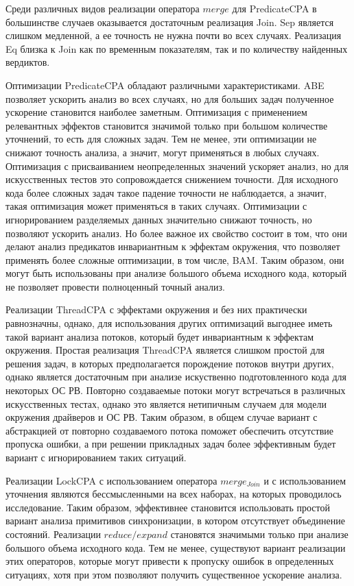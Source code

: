 Среди различных видов реализации оператора $merge$ для PredicateCPA в большинстве случаев оказывается достаточным реализация Join. 
Sep является слишком медленной, а ее точность не нужна почти во всех случаях. Реализация Eq близка к Join как по временным показателям, так и по количеству найденных вердиктов.

Оптимизации PredicateCPA обладают различными характеристиками. ABE позволяет ускорить анализ во всех случаях, но для больших задач полученное ускорение становится наиболее заметным. 
Оптимизация с применением релевантных эффектов становится значимой только при большом количестве уточнений, то есть для сложных задач.
Тем не менее, эти оптимизации не снижают точность анализа, а значит, могут применяться в любых случаях.
Оптимизация с присваиванием неопределенных значений ускоряет анализ, но для искусственных тестов это сопровождается снижением точности.
Для исходного кода более сложных задач такое падение точности не наблюдается, а значит, такая оптимизация может применяться в таких случаях.
Оптимизации с игнорированием разделяемых данных значительно снижают точность, но позволяют ускорить анализ.
Но более важное их свойство состоит в том, что они делают анализ предикатов инвариантным к эффектам окружения, что позволяет применять более сложные оптимизации, в том числе, BAM.
Таким образом, они могут быть использованы при анализе большого объема исходного кода, который не позволяет провести полноценный точный анализ.

Реализации ThreadCPA с эффектами окружения и без них практически равнозначны, однако, для использования других оптимизаций выгоднее иметь такой вариант анализа потоков, который будет инвариантным к эффектам окружения.
Простая реализация ThreadCPA является слишком простой для решения задач, в которых предполагается порождение потоков внутри других, однако является достаточным при анализе искуственно подготовленного кода для некоторых ОС РВ.
Повторно создаваемые потоки могут встречаться в различных искусственных тестах, однако это является нетипичным случаем для модели окружения драйверов и ОС РВ.
Таким образом, в общем случае вариант с абстракцией от повторно создаваемого потока поможет обеспечить отсутствие пропуска ошибки, а при решении прикладных задач более эффективным будет вариант с игнорированием таких ситуаций.

Реализации LockCPA с использованием оператора $merge_{Join}$ и с использованием уточнения являются бессмысленными на всех наборах, на которых проводилось исследование. 
Таким образом, эффективнее становится использовать простой вариант анализа примитивов синхронизации, в котором отсутствует объединение состояний.
Реализации $reduce/expand$ становятся значимыми только при анализе большого объема исходного кода.
Тем не менее, существуют вариант реализации этих операторов, которые могут привести к пропуску ошибок в определенных ситуациях, хотя при этом позволяют получить существенное ускорение анализа.

